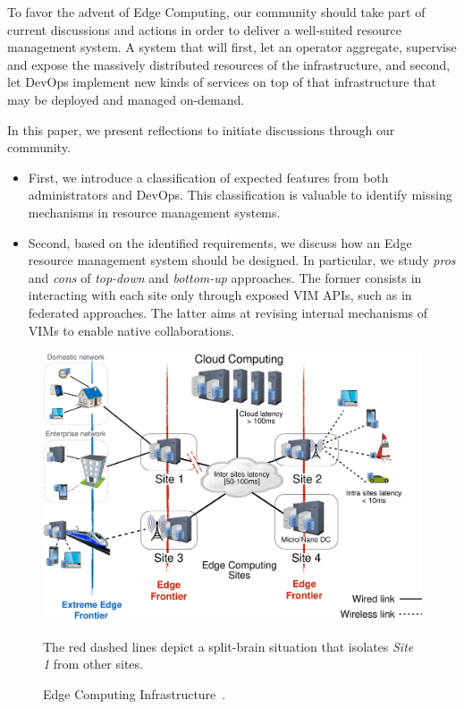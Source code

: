 To favor the advent of Edge Computing, our community should take part
of current discussions and actions in order to deliver a well-suited
resource management system. A system that will first, let an operator aggregate, supervise and expose the massively distributed resources of the infrastructure, 
and second, let DevOps implement new kinds of services on top of that infrastructure that may be deployed and managed on-demand.


In this paper, we present reflections to initiate discussions through our community.

\begin{itemize}
\item First, we introduce a classification of expected features from
  both administrators and DevOps. This classification is valuable to
  identify missing mechanisms in resource management systems.
\item Second, based on the identified requirements, we discuss
  how an Edge resource management system
  should be designed. In particular, we study \emph{pros} and
  \emph{cons} of \emph{top-down} and \emph{bottom-up} approaches. The
  former consists in interacting with each site only through
  exposed VIM APIs, such as in federated approaches. The
  latter aims at revising internal mechanisms of VIMs to enable native
  collaborations.
  \end{itemize}

\begin{figure}[t]
  \centering
  \includegraphics[width=\columnwidth]{./figures/figure_fog.pdf}
  \caption{Edge Computing Infrastructure~\cite{7923796}.}
    {\small The red dashed lines depict a split-brain situation that isolates
    \emph{Site 1} from other sites.}
  \label{fig:fogedge-archi}
\end{figure}

